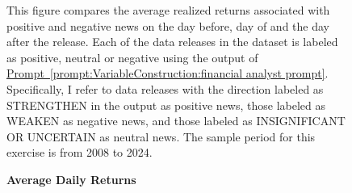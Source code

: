 \documentclass[12pt,oneside,letter]{article}
\newcommand*{\myprp}[1]{\hyperref[{#1}]{Prompt~\ref*{#1}}}
\begin{document}
\begin{appendices}
\begin{landscape}
\begin{figure}
	\end{figure}

\end{landscape}


		\begin{landscape}
	
	\begin{figure}

	    \begin{center}
	    	\caption{\bf Average Daily Returns}
		    \medskip
		     \label{fig:DifferentialImpact:pos neg differential impact expanded window}
	    \end{center}
	
	
	    \begin{small}
	    This figure compares the average realized returns associated with positive and negative news on the day before, day of and the day after the release. Each of the data releases in the dataset is labeled as positive, neutral or negative using the output of \myprp{prompt:VariableConstruction:financial analyst prompt}. Specifically, I refer to data releases with the direction labeled as STRENGTHEN in the output as positive news, those labeled as WEAKEN as negative news, and those labeled as INSIGNIFICANT OR UNCERTAIN as neutral news. The sample period for this exercise is from 2008 to 2024.
	    \end{small}



\end{figure}
\end{landscape}
\end{appendices}
\end{document}
